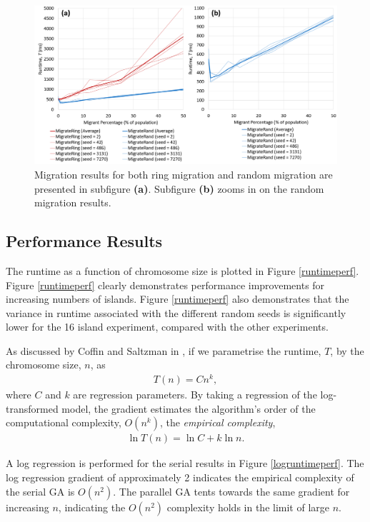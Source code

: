 \documentclass{report}
\begin{document}
\label{migresults}
\begin{figure}[h]
\includegraphics[scale=0.38]{migration_performance}
\caption{Migration results for both ring migration and random migration are presented in subfigure \textbf{(a)}. Subfigure \textbf{(b)} zooms in on the random migration results.}\label{migresfig}
\end{figure}

\subsection{Performance Results}
The runtime as a function of chromosome size is plotted in Figure \ref{runtimeperf}. Figure \ref{runtimeperf} clearly demonstrates performance improvements for increasing numbers of islands. Figure \ref{runtimeperf} also demonstrates that the variance in runtime associated with the different random seeds is significantly lower for the 16 island experiment, compared with the other experiments.  


As discussed by Coffin and Saltzman in \cite{coffin2000statistical}, if we parametrise the runtime, \(T\), by the chromosome size, \(n\), as 
\begin{align*}
T(n) = Cn^k,
\end{align*}
where \(C\) and \(k\) are regression parameters. By taking a regression of the log-transformed model, the gradient estimates the algorithm's order of the computational complexity, \(O(n^k)\), the \textit{empirical complexity},
\begin{align*}
\ln T(n) = \ln C + k \ln n.
\end{align*}

A log regression is performed for the serial results in Figure \ref{logruntimeperf}. The log regression gradient of approximately 2 indicates the empirical complexity of the serial GA is \(O(n^2)\).  The parallel GA tents towards the same gradient for increasing \(n\), indicating the \(O(n^2)\) complexity holds in the limit of large \(n\). 
\end{document}
